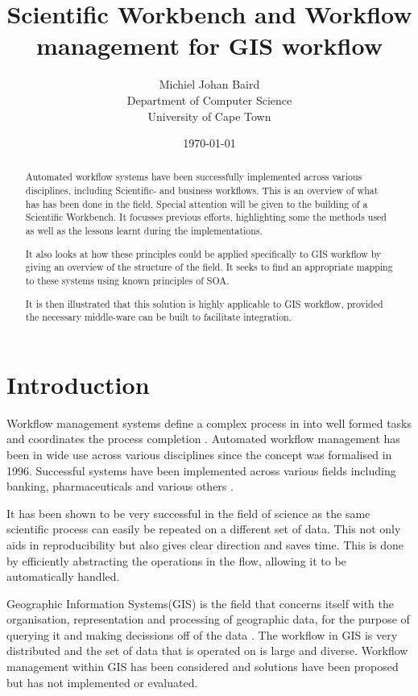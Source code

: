 \documentclass[11pt,twocolumn]{article}
\title{Scientific Workbench and Workflow management for GIS workflow}
\author{
    Michiel Johan Baird \\
        Department of Computer Science \\
        University of Cape Town
}
\date{\today}
\begin{document}
\maketitle
\begin{abstract}
    Automated workflow systems have been successfully implemented
    across various disciplines, including Scientific- and business
    workflows. This is an overview of what has has been done
    in the field. Special attention will be given
    to the building of a Scientific Workbench. It focusses previous efforts, highlighting some the methods used
    as well as the lessons learnt during the implementations.

    It also looks at how these principles could be applied
    specifically to GIS workflow by giving an overview of the
    structure of the field. It seeks to find an appropriate
    mapping to these systems using known principles of SOA.

    It is then illustrated that this solution is highly applicable
    to GIS workflow, provided the necessary middle-ware can be built
    to facilitate integration.
\end{abstract}
\section{Introduction}
    Workflow management systems define a complex process in
    into well formed tasks and coordinates the process
    completion \cite{1245778}.
    Automated workflow management has been in wide use across
    various disciplines since the concept was formalised in
    1996\cite{springerlink:10.1007/BF00136712}. Successful systems
    have been implemented across various fields including banking,
    pharmaceuticals and various others
    \cite{Brahe:2007:SWW:1316624.1316661,5407993}.

    It has been shown to be very successful in the field
    of science as the same scientific process can easily
    be repeated on
    a different set of data.\cite{4721191}
    This not only aids in reproducibility but also gives
    clear direction and saves time. This is done by efficiently
    abstracting the operations in the flow, allowing it
    to be automatically handled.

    Geographic Information Systems(GIS) is the field that
    concerns itself with the organisation, representation
    and processing of geographic data, for the purpose of
    querying it and making decissions off of the data
    \cite{DiMartino:2007:TAG:1341012.1341081}. The
    workflow in GIS is very distributed and the set
    of data that is operated on is large and diverse.
    Workflow management within GIS has been considered
    and solutions have been proposed but has not implemented
    or evaluated\cite{Migliorini:2011:WTG:1999320.1999356}.
\end{document}
